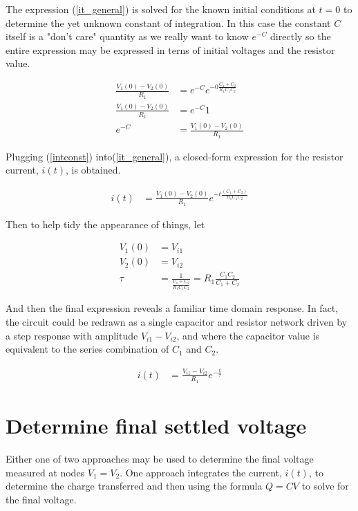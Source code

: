 \documentclass[12pt,letterpaper]{report}
\begin{document}
	The expression (\ref{it_general}) is solved for the known initial conditions at $t=0$ to determine the yet unknown constant of integration.  In this case the constant $C$ itself is a "don't care" quantity as we really want to know $e^{-C}$ directly so the entire expression may be expressed in terns of initial voltages and the resistor value.
	
	\begin{align}
		\frac{V_1(0) - V_2(0)}{R_1} &=  e^{-C} e^{-0  \frac{C_1 + C_2}{R_1 C_1 C_2}} \nonumber \\
		 \frac{V_1(0) - V_2(0)}{R_1} &=  e^{-C} 1 \nonumber \\
		 e^{-C} &= \frac{V_1(0) - V_2(0)}{R_1} \label{intconst}
	\end{align}

	Plugging (\ref{intconst}) into(\ref{it_general}), a closed-form expression for the resistor current, $i(t)$, is obtained.
	
	\begin{align}
		i(t) &= \frac{V_1(0) - V_2(0)}{R_1}  e^{-t \frac{(C_1 + C_2)}{R_1 C_1 C_2}} 
	\end{align}
	
	Then to help tidy the appearance of things, let
	
	\begin{align}
		V_1(0) &= V_{i1} \\
		V_2(0) &= V_{i2} \\
		\tau &= \frac{1}{ \frac{C_1 + C_2}{R_1 C_1 C_2} } = R_1 \frac{C_1 C_2}{C_1 + C_2}
	\end{align}

	And then the final expression reveals a familiar time domain response. In fact, the circuit could be redrawn as a single capacitor and resistor network driven by a step response with amplitude $V_{i1} - V_{i2}$, and where the capacitor value is equivalent to the series combination of $C_1$ and $C_2$.
	
	\begin{align}
	i(t) &= \frac{V_{i1} - V_{i2}}{R_1}  e^{-\frac{t}{\tau}} 
	\end{align}

	\section{Determine final settled voltage}
	Either one of two approaches may be used to determine the final voltage measured at nodes $V_1 = V_2$.  One approach integrates the current, $i(t)$, to determine the charge transferred and then using the formula $Q=CV$ to solve for the final voltage.  
	
\end{document}
